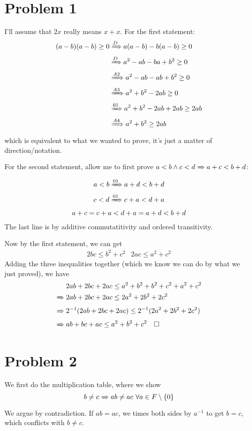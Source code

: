 \documentclass[12pt]{article}
\newcommand{\ra}{\xRightarrow}
\begin{document}
\section{Problem 1}

I'll assume that $2x$ really means $x+x$.
For the first statement:
\begin{align*}
      (a-b)(a-b) \ge 0
       & \ra{D} a(a-b)-b(a-b) \ge 0      \\
       & \ra{D} a^2-ab-ba+b^2 \ge 0      \\
       & \ra{A2} a^2-ab-ab+b^2 \ge 0     \\
       & \ra{A3} a^2+b^2-2ab \ge 0       \\
       & \ra{01} a^2+b^2-2ab+2ab \ge 2ab \\
       & \ra{A4} a^2+b^2 \ge 2ab
\end{align*}
which is equivalent to what we wanted to prove,
it's just a matter of direction/notation.

For the second statement, allow me to first prove
$a<b \land c<d \ra\  a+c<b+d$:
\begin{gather*}
      a<b \ra{01} a+d<b+d \\
      c<d \ra{01} c+a<d+a \\
      a+c=c+a<d+a=a+d<b+d
\end{gather*}
The last line is by additive commutatitivity and ordered transitivity.

Now by the first statement, we can get
\begin{align*}
      2bc \le b^2+c^2 & 2ac \le a^2+c^2
\end{align*}
Adding the three inequalities together
(which we know we can do by what we just proved), we have
\begin{align*}
              & 2ab+2bc+2ac \le a^2+b^2+b^2+c^2+a^2+c^2        \\
      \ra\ {} & 2ab+2bc+2ac \le 2a^2+2b^2+2c^2                 \\
      \ra\ {} & 2^{-1}(2ab+2bc+2ac) \le 2^{-1}(2a^2+2b^2+2c^2) \\
      \ra\ {} & ab+bc+ac \le a^2+b^2+c^2\quad\square
\end{align*}

\pagebreak

\section{Problem 2}

We first do the multiplication table, where we show
\[b \ne c \ra\  ab \ne ac\ \forall a \in F \setminus \{0\}\]
We argue by contradiction.
If $ab=ac$, we times both sides by $a^{-1}$ to get $b=c$,
which conflicts with $b \ne c$.
\end{document}
